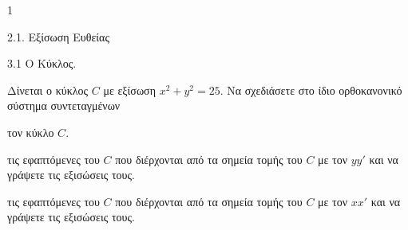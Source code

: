 \begin{ylh}{1}
    \item 2.1. Εξίσωση Ευθείας
    \item 3.1 Ο Κύκλος.
\end{ylh}
Δίνεται ο κύκλος $C$ με εξίσωση $x^2 + y^2 = 25$. Να σχεδιάσετε στο ίδιο ορθοκανονικό σύστημα συντεταγμένων
\begin{alist}
\item τον κύκλο $C$. 
\item τις εφαπτόμενες του $C$ που διέρχονται από τα σημεία τομής του $C$ με τον $yy'$ και να γράψετε τις εξισώσεις τους. 
\item τις εφαπτόμενες του $C$ που διέρχονται από τα σημεία τομής του $C$ με τον $xx'$ και να γράψετε τις εξισώσεις τους. 
\end{alist}